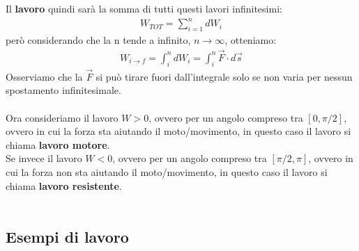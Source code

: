         Il \textbf{lavoro} quindi sarà la somma di tutti questi lavori infinitesimi:
        \begin{align*}
            W_{TOT}=\sum_{i=1}^n dW_i
        \end{align*}
        però considerando che la n tende a infinito, $n\rightarrow\infty$, otteniamo:
        \begin{align*}
            W_{i\rightarrow f}=\int_i^n dW_i=\int_i^n \vec{F}\cdot d\vec{s}
        \end{align*}
        Osserviamo che la $\vec{F}$ si può tirare fuori dall'integrale solo se non varia per nessun spostamento infinitesimale.\\\\
        Ora consideriamo il lavoro $W>0$, ovvero per un angolo compreso tra $[0,\pi/2]$, ovvero in cui la forza sta aiutando il moto/movimento, in questo caso il lavoro si chiama \textbf{lavoro motore}.\\
        Se invece il lavoro $W<0$, ovvero per un angolo compreso tra $[\pi/2,\pi]$, ovvero in cui la forza non sta aiutando il moto/movimento, in questo caso il lavoro si chiama \textbf{lavoro resistente}.\\\\

    \subsection{Esempi di lavoro}
